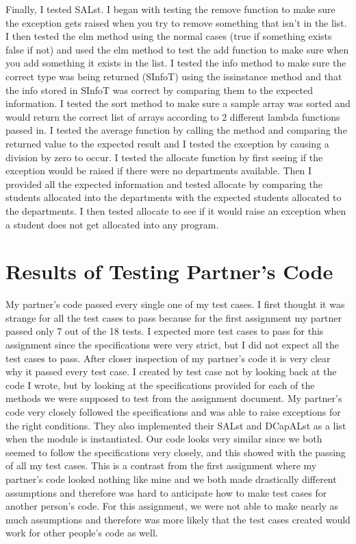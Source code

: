 \documentclass[12pt]{article}
\begin{document}
Finally, I tested SALst. I began with testing the remove function to make sure the exception gets raised when you try to remove something that isn’t in the list. I then tested the elm method using the normal cases (true if something exists false if not) and used the elm method to test the add function to make sure when you add something it exists in the list. I tested the info method to make sure the correct type was being returned (SInfoT) using the issinstance method and that the info stored in SInfoT was correct by comparing them to the expected information. I tested the sort method to make sure a sample array was sorted and would return the correct list of arrays according to 2 different lambda functions passed in. I tested the average function by calling the method and comparing the returned value to the expected result and I tested the exception by causing a division by zero to occur. I tested the allocate function by first seeing if the exception would be raised if there were no departments available. Then I provided all the expected information and tested allocate by comparing the students allocated into the departments with the expected students allocated to the departments. I then tested allocate to see if it would raise an exception when a student does not get allocated into any program.


\section{Results of Testing Partner's Code}

My partner’s code passed every single one of my test cases. I first thought it was strange for all the test cases to pass because for the first assignment my partner passed only 7 out of the 18 tests. I expected more test cases to pass for this assignment since the specifications were very strict, but I did not expect all the test cases to pass. After closer inspection of my partner’s code it is very clear why it passed every test case. I created by test case not by looking back at the code I wrote, but by looking at the specifications provided for each of the methods we were supposed to test from the assignment document. My partner’s code very closely followed the specifications and was able to raise exceptions for the right conditions. They also implemented their SALst and DCapALst as a list when the module is instantiated. Our code looks very similar since we both seemed to follow the specifications very closely, and this showed with the passing of all my test cases. This is a contrast from the first assignment where my partner’s code looked nothing like mine and we both made drastically different assumptions and therefore was hard to anticipate how to make test cases for another person’s code. For this assignment, we were not able to make nearly as much assumptions and therefore was more likely that the test cases created would work for other people’s code as well.
\end{document}
